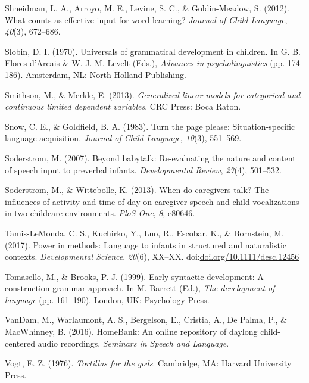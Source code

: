 \documentclass[floatsintext,man]{apa6}
\theoremstyle{definition}
\theoremstyle{definition}
\theoremstyle{definition}
\theoremstyle{remark}
\begin{document}
\hypertarget{ref-shneidman2012counts}{}
Shneidman, L. A., Arroyo, M. E., Levine, S. C., \& Goldin-Meadow, S.
(2012). What counts as effective input for word learning? \emph{Journal
of Child Language}, \emph{40}(3), 672--686.

\hypertarget{ref-slobin1970universals}{}
Slobin, D. I. (1970). Universals of grammatical development in children.
In G. B. Flores d'Arcais \& W. J. M. Levelt (Eds.), \emph{Advances in
psycholinguistics} (pp. 174--186). Amsterdam, NL: North Holland
Publishing.

\hypertarget{ref-smithson2013generalized}{}
Smithson, M., \& Merkle, E. (2013). \emph{Generalized linear models for
categorical and continuous limited dependent variables}. CRC Press: Boca
Raton.

\hypertarget{ref-snow1983turn}{}
Snow, C. E., \& Goldfield, B. A. (1983). Turn the page please:
Situation-specific language acquisition. \emph{Journal of Child
Language}, \emph{10}(3), 551--569.

\hypertarget{ref-soderstrom2007beyond}{}
Soderstrom, M. (2007). Beyond babytalk: Re-evaluating the nature and
content of speech input to preverbal infants. \emph{Developmental
Review}, \emph{27}(4), 501--532.

\hypertarget{ref-soderstrom2013when}{}
Soderstrom, M., \& Wittebolle, K. (2013). When do caregivers talk? The
influences of activity and time of day on caregiver speech and child
vocalizations in two childcare environments. \emph{PloS One}, \emph{8},
e80646.

\hypertarget{ref-tamislemonda2017power}{}
Tamis-LeMonda, C. S., Kuchirko, Y., Luo, R., Escobar, K., \& Bornstein,
M. (2017). Power in methods: Language to infants in structured and
naturalistic contexts. \emph{Developmental Science}, \emph{20}(6),
XX--XX.
doi:\href{https://doi.org/doi.org/10.1111/desc.12456}{doi.org/10.1111/desc.12456}

\hypertarget{ref-tomasello1999early}{}
Tomasello, M., \& Brooks, P. J. (1999). Early syntactic development: A
construction grammar approach. In M. Barrett (Ed.), \emph{The
development of language} (pp. 161--190). London, UK: Psychology Press.

\hypertarget{ref-HomeBank}{}
VanDam, M., Warlaumont, A. S., Bergelson, E., Cristia, A., De Palma, P.,
\& MacWhinney, B. (2016). HomeBank: An online repository of daylong
child-centered audio recordings. \emph{Seminars in Speech and Language}.

\hypertarget{ref-vogt1976tortillas}{}
Vogt, E. Z. (1976). \emph{Tortillas for the gods}. Cambridge, MA:
Harvard University Press.
\end{document}
